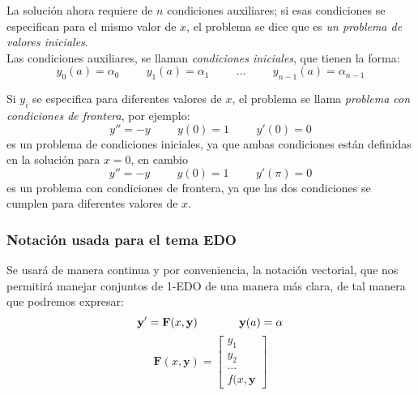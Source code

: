 \begin{frame}
La solución ahora requiere de $n$ condiciones auxiliares; si esas condiciones se especifican para el mismo valor de $x$, el problema se dice que es \emph{un problema de valores iniciales}.
\\
\medskip
Las condiciones auxiliares, se llaman \emph{condiciones iniciales}, que tienen la forma:
\[ y_{0}(a) = \alpha_{0} \hspace{1cm} y_{1}(a) = \alpha_{1} \hspace{1cm} \ldots \hspace{1cm} y_{n-1}(a) = \alpha_{n-1}\]
\end{frame}
\begin{frame}
Si $y_{i}$ se especifica para diferentes valores de $x$, el problema se llama \emph{problema con condiciones de frontera}, por ejemplo:
\[ y'' = -y \hspace{1cm} y(0)=1 \hspace{1cm} y'(0) = 0\]
es un problema de condiciones iniciales, ya que ambas condiciones están definidas en la solución para $x=0$, en cambio
\[ y'' = -y \hspace{1cm} y(0)=1 \hspace{1cm} y'(\pi) = 0\]
es un problema con condiciones de frontera, ya que las dos condiciones se cumplen para diferentes valores de $x$.
\end{frame}
\begin{frame}
\frametitle{Notación usada para el tema EDO}
Se usará de manera continua y por conveniencia, la notación vectorial, que nos permitirá manejar conjuntos de 1-EDO de una manera más clara, de tal manera que podremos expresar:
\[ \mathbf{y}' = \mathbf{F}(x,\mathbf{y}) \hspace{1.3cm} \mathbf{y}(a) = \alpha\]
\[ \mathbf{F}(x,\mathbf{y}) = \left[ \begin{matrix}
y_{1} \\
y_{2} \\
\ldots \\
f(x,\mathbf{y}
\end{matrix} \right] \]
\end{frame}
